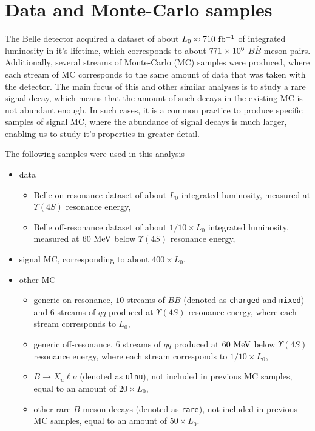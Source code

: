 \chapter{Data and Monte-Carlo samples}\label{sec:data-and-monte-carlo-samples}

The Belle detector acquired a dataset of about $L_0 \approx 710\mathrm{~fb^{-1}}$ of integrated luminosity in it's lifetime, which corresponds to about $771\times 10^{6}$ $B \bar B$ meson pairs. Additionally, several streams of Monte-Carlo (MC) samples were produced, where each stream of MC corresponds to the same amount of data that was taken with the detector. The main focus of this and other similar analyses is to study a rare signal decay, which means that the amount of such decays in the existing MC is not abundant enough. In such cases, it is a common practice to produce specific samples of signal MC, where the abundance of signal decays is much larger, enabling us to study it's properties in greater detail.

The following samples were used in this analysis
\begin{itemize}
\item data
\begin{itemize}
\item Belle on-resonance dataset of about $L_0$ integrated luminosity, measured at $\Upsilon(4S)$ resonance energy,
\item Belle off-resonance dataset of about $1/10 \times L_0$ integrated luminosity, measured at $60\mathrm{~MeV}$ below $\Upsilon(4S)$ resonance energy,
\end{itemize}
\item signal MC, corresponding to about $400 \times L_0$,
\item other MC
\begin{itemize}
\item generic on-resonance, $10$ streams of $B\bar B$ (denoted as \texttt{charged} and \texttt{mixed}) and $6$ streams of $q\bar q$ produced at $\Upsilon(4S)$ resonance energy, where each stream corresponds to $L_0$,
\item generic off-resonance, $6$ streams of $q\bar q$ produced at $60\mathrm{~MeV}$ below $\Upsilon(4S)$ resonance energy, where each stream corresponds to $1/10 \times L_0$,
\item $B\to X_u \ell \nu$ (denoted as \texttt{ulnu}), not included in previous MC samples, equal to an amount of $20 \times L_0$, 
\item other rare $B$ meson decays (denoted as \texttt{rare}), not included in previous MC samples, equal to an amount of $50 \times L_0$.
\end{itemize}
\end{itemize}

